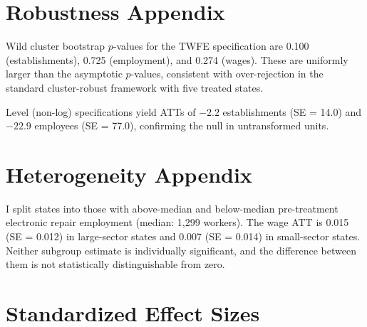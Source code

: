 \documentclass[12pt]{article}
\begin{document}
\section{Robustness Appendix}

Wild cluster bootstrap $p$-values for the TWFE specification are 0.100 (establishments), 0.725 (employment), and 0.274 (wages). These are uniformly larger than the asymptotic $p$-values, consistent with over-rejection in the standard cluster-robust framework with five treated states.

Level (non-log) specifications yield ATTs of $-2.2$ establishments (SE = 14.0) and $-22.9$ employees (SE = 77.0), confirming the null in untransformed units.

\section{Heterogeneity Appendix}

I split states into those with above-median and below-median pre-treatment electronic repair employment (median: 1,299 workers). The wage ATT is 0.015 (SE = 0.012) in large-sector states and 0.007 (SE = 0.014) in small-sector states. Neither subgroup estimate is individually significant, and the difference between them is not statistically distinguishable from zero.

\section{Standardized Effect Sizes}
\label{sec:sde}


\end{document}
